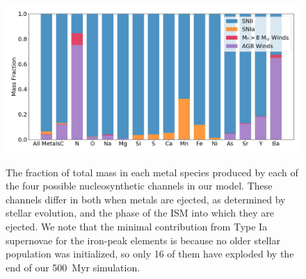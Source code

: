 \documentclass[twocolumn]{aastex61}
\begin{document}
\begin{figure}
\centering
\includegraphics[width=0.95\linewidth]{species_bar_sources.png}\\
\caption{The fraction of total mass in each metal species produced by each of the four possible nucleosynthetic channels in our model. These channels differ in both when metals are ejected, as determined by stellar evolution, and the phase of the ISM into which they are ejected.
We note that the minimal contribution from Type Ia supernovae for the iron-peak elements is because  no older stellar population was initialized, so only 16 of them have exploded by the end of our 500~Myr simulation.}

\label{fig:species_sources}
\end{figure}
\end{document}
